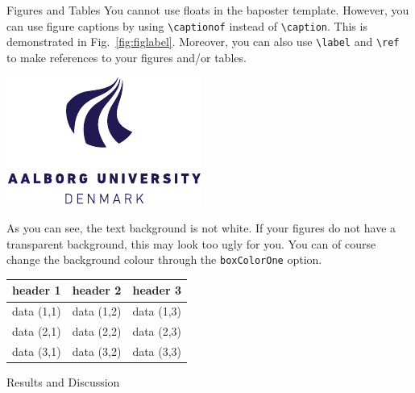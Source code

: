 \documentclass[a0paper,portrait]{baposter}
\begin{document}
\begin{poster}
\begin{posterbox}[name=figures,column=1,below=implementation,above=bottom]{Figures and Tables}
You cannot use floats in the baposter template. However, you can use figure captions by using {\tt \textbackslash captionof} instead of {\tt \textbackslash caption}. This is demonstrated in Fig.~\ref{fig:figlabel}. Moreover, you can also use {\tt \textbackslash label} and {\tt \textbackslash ref} to make references to your figures and/or tables.
\begin{center}
  \includegraphics{AAUgraphics/aau_logo_new}
  \label{fig:figlabel}
\end{center}
As you can see, the text background is not white. If your figures do not have a transparent background, this may look too ugly for you. You can of course change the background colour through the {\tt boxColorOne} option. 
\begin{center}
  \begin{tabular}{c c c}
    \toprule
    header 1 & header 2 & header 3\\
    \midrule
    data (1,1) & data (1,2) & data (1,3)\\
    data (2,1) & data (2,2) & data (2,3)\\
    data (3,1) & data (3,2) & data (3,3)\\
    \bottomrule
  \end{tabular}
  \label{tab:tablabel}
\end{center}
\end{posterbox}

\begin{posterbox}[name=discussion,column=2,row=0]{Results and Discussion}
  \begin{center}
	\centering
  \begin{tabular}{|c|c|c|}\hline
   

\end{tabular}
\end{center}
\end{posterbox}
\end{poster}
\end{document}
